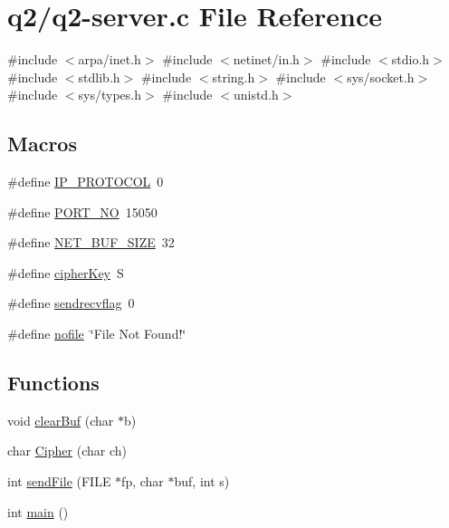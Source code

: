 \hypertarget{q2-server_8c}{}\section{q2/q2-\/server.c File Reference}
\label{q2-server_8c}
{\ttfamily \#include $<$arpa/inet.\+h$>$}\newline
{\ttfamily \#include $<$netinet/in.\+h$>$}\newline
{\ttfamily \#include $<$stdio.\+h$>$}\newline
{\ttfamily \#include $<$stdlib.\+h$>$}\newline
{\ttfamily \#include $<$string.\+h$>$}\newline
{\ttfamily \#include $<$sys/socket.\+h$>$}\newline
{\ttfamily \#include $<$sys/types.\+h$>$}\newline
{\ttfamily \#include $<$unistd.\+h$>$}\newline
\subsection*{Macros}
\begin{DoxyCompactItemize}
\item 
\#define \hyperlink{q2-server_8c_ac0a4ce3bd388c7823743b526e7cb77fb}{I\+P\+\_\+\+P\+R\+O\+T\+O\+C\+OL}~0
\item 
\#define \hyperlink{q2-server_8c_a47a4d3bbd05894abbce0ffd1d266aa88}{P\+O\+R\+T\+\_\+\+NO}~15050
\item 
\#define \hyperlink{q2-server_8c_a30ba2113ad1b0f91029d017fc988d9af}{N\+E\+T\+\_\+\+B\+U\+F\+\_\+\+S\+I\+ZE}~32
\item 
\#define \hyperlink{q2-server_8c_abace6f1e028b11cc237bd95c5dbe451a}{cipher\+Key}~\textquotesingle{}S\textquotesingle{}
\item 
\#define \hyperlink{q2-server_8c_a6e618c0ec6ffc8ac4489d11c65a5a67c}{sendrecvflag}~0
\item 
\#define \hyperlink{q2-server_8c_a49e1fa6b4860231cbcb87bd74f65569f}{nofile}~\char`\"{}File Not Found!\char`\"{}
\end{DoxyCompactItemize}
\subsection*{Functions}
\begin{DoxyCompactItemize}
\item 
void \hyperlink{q2-server_8c_a37e9b2e0b0fcbe7d2d5bd9c9467c1fb8}{clear\+Buf} (char $\ast$b)
\item 
char \hyperlink{q2-server_8c_a4fc6ad5854f646cf1e284f66e104219f}{Cipher} (char ch)
\item 
int \hyperlink{q2-server_8c_a19fc2d7afbfbca5d5b78534e8eeb6b29}{send\+File} (F\+I\+LE $\ast$fp, char $\ast$buf, int s)
\item 
int \hyperlink{q2-server_8c_ae66f6b31b5ad750f1fe042a706a4e3d4}{main} ()
\end{DoxyCompactItemize}


